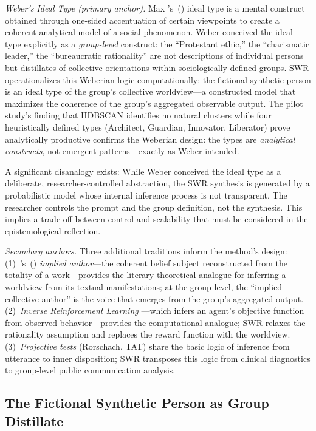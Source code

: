 \documentclass[11pt,a4paper]{article}
\theoremstyle{definition}
\theoremstyle{plain}
\theoremstyle{remark}
\begin{document}
\emph{Weber's Ideal Type (primary anchor).} Max \citeauthor{Weber1904}'s~(\citeyear{Weber1904}) ideal type is a mental construct obtained through one-sided accentuation of certain viewpoints to create a coherent analytical model of a social phenomenon. Weber conceived the ideal type explicitly as a \emph{group-level} construct: the ``Protestant ethic,'' the ``charismatic leader,'' the ``bureaucratic rationality'' are not descriptions of individual persons but distillates of collective orientations within sociologically defined groups. SWR operationalizes this Weberian logic computationally: the fictional synthetic person is an ideal type of the group's collective worldview---a constructed model that maximizes the coherence of the group's aggregated observable output. The pilot study's finding that HDBSCAN identifies no natural clusters while four heuristically defined types (Architect, Guardian, Innovator, Liberator) prove analytically productive confirms the Weberian design: the types are \emph{analytical constructs}, not emergent patterns---exactly as Weber intended.

A significant disanalogy exists: While Weber conceived the ideal type as a deliberate, researcher-controlled abstraction, the SWR synthesis is generated by a probabilistic model whose internal inference process is not transparent. The researcher controls the prompt and the group definition, not the synthesis. This implies a trade-off between control and scalability that must be considered in the epistemological reflection.

\emph{Secondary anchors.} Three additional traditions inform the method's design: (1)~\citeauthor{Booth1961}'s~(\citeyear{Booth1961}) \emph{implied author}---the coherent belief subject reconstructed from the totality of a work---provides the literary-theoretical analogue for inferring a worldview from its textual manifestations; at the group level, the ``implied collective author'' is the voice that emerges from the group's aggregated output. (2)~\emph{Inverse Reinforcement Learning} \citep{NgRussell2000}---which infers an agent's objective function from observed behavior---provides the computational analogue; SWR relaxes the rationality assumption and replaces the reward function with the worldview. (3)~\emph{Projective tests} (Rorschach, TAT) share the basic logic of inference from utterance to inner disposition; SWR transposes this logic from clinical diagnostics to group-level public communication analysis.


\subsection{The Fictional Synthetic Person as Group Distillate}
\end{document}
